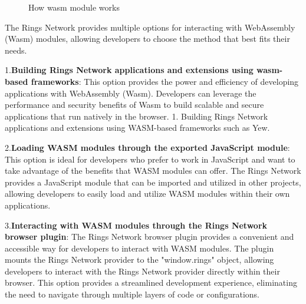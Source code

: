 \documentclass[twocolumn]{article}
\begin{document}
\begin{figure}[htbp]
\caption{How wasm module works}
\end{figure}

The Rings Network provides multiple options for interacting with WebAssembly (Wasm) modules, allowing developers to choose the method that best fits their needs.

1.\textbf{Building Rings Network applications and extensions using wasm-based frameworks}: This option provides the power and efficiency of developing applications with WebAssembly (Wasm). Developers can leverage the performance and security benefits of Wasm to build scalable and secure applications that run natively in the browser.
1. Building Rings Network applications and extensions using WASM-based frameworks such as Yew.

2.\textbf{Loading WASM modules through the exported JavaScript module}: This option is ideal for developers who prefer to work in JavaScript and want to take advantage of the benefits that WASM modules can offer. The Rings Network provides a JavaScript module that can be imported and utilized in other projects, allowing developers to easily load and utilize WASM modules within their own applications.

3.\textbf{Interacting with WASM modules through the Rings Network browser plugin}: The Rings Network browser plugin provides a convenient and accessible way for developers to interact with WASM modules. The plugin mounts the Rings Network provider to the "window.rings" object, allowing developers to interact with the Rings Network provider directly within their browser. This option provides a streamlined development experience, eliminating the need to navigate through multiple layers of code or configurations.
\end{document}
